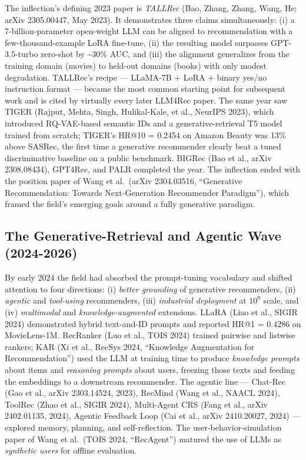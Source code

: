 The inflection's defining 2023 paper is \emph{TALLRec} (Bao, Zhang, Zhang, Wang, He; arXiv 2305.00447, May 2023). It demonstrates three claims simultaneously: (i) a 7-billion-parameter open-weight LLM can be aligned to recommendation with a few-thousand-example LoRA fine-tune, (ii) the resulting model surpasses GPT-3.5-turbo zero-shot by \textasciitilde30\% AUC, and (iii) the alignment generalizes from the training domain (movies) to held-out domains (books) with only modest degradation. TALLRec's recipe --- LLaMA-7B + LoRA + binary yes/no instruction format --- became the most common starting point for subsequent work and is cited by virtually every later LLM4Rec paper. The same year saw TIGER (Rajput, Mehta, Singh, Hulikal-Kale, et al., NeurIPS 2023), which introduced RQ-VAE-based semantic IDs and a generative-retrieval T5 model trained from scratch; TIGER's HR@10 = 0.2454 on Amazon Beauty was 13\% above SASRec, the first time a generative recommender clearly beat a tuned discriminative baseline on a public benchmark. BIGRec (Bao et al., arXiv 2308.08434), GPT4Rec, and PALR completed the year. The inflection ended with the position paper of Wang et al.~(arXiv 2304.03516, ``Generative Recommendation: Towards Next-Generation Recommender Paradigm''), which framed the field's emerging goals around a fully generative paradigm.

\subsection{The Generative-Retrieval and Agentic Wave (2024-2026)}\label{the-generative-retrieval-and-agentic-wave-2024-2026}

By early 2024 the field had absorbed the prompt-tuning vocabulary and shifted attention to four directions: (i) \emph{better grounding} of generative recommenders, (ii) \emph{agentic} and \emph{tool-using} recommenders, (iii) \emph{industrial deployment} at \(10^9\) scale, and (iv) \emph{multimodal} and \emph{knowledge-augmented} extensions. LLaRA (Liao et al., SIGIR 2024) demonstrated hybrid text-and-ID prompts and reported HR@1 = 0.4286 on MovieLens-1M. RecRanker (Luo et al., TOIS 2024) trained pairwise and listwise rankers; KAR (Xi et al., RecSys 2024, ``Knowledge Augmentation for Recommendation'') used the LLM at training time to produce \emph{knowledge prompts} about items and \emph{reasoning prompts} about users, freezing those texts and feeding the embeddings to a downstream recommender. The agentic line --- Chat-Rec (Gao et al., arXiv 2303.14524, 2023), RecMind (Wang et al., NAACL 2024), ToolRec (Zhao et al., SIGIR 2024), Multi-Agent CRS (Fang et al., arXiv 2402.01135, 2024), Agentic Feedback Loop (Cai et al., arXiv 2410.20027, 2024) --- explored memory, planning, and self-reflection. The user-behavior-simulation paper of Wang et al.~(TOIS 2024, ``RecAgent'') matured the use of LLMs as \emph{synthetic users} for offline evaluation.

